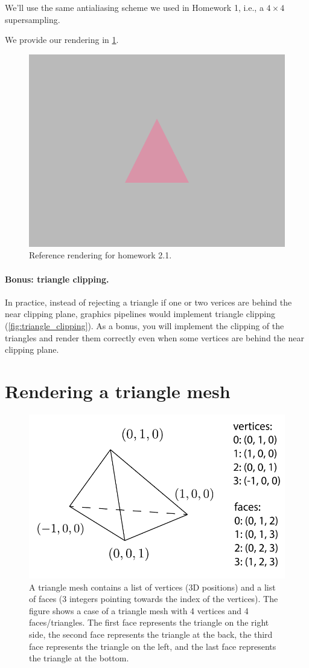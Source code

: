 We'll use the same antialiasing scheme we used in Homework 1, i.e., a $4\times4$ supersampling.

We provide our rendering in \cref{fig:hw2_1}.
\begin{figure}[h]
    \centering
    \includegraphics[width=0.7\linewidth]{imgs/hw_2_1.png}
    \caption{Reference rendering for homework 2.1.}
    \label{fig:hw2_1}
\end{figure}

\paragraph{Bonus: triangle clipping.} In practice, instead of rejecting a triangle if one or two verices are behind the near clipping plane, graphics pipelines would implement triangle clipping (\cref{fig:triangle_clipping}). As a bonus, you will implement the clipping of the triangles and render them correctly even when some vertices are behind the near clipping plane.

\section{Rendering a triangle mesh}

\begin{figure}[h]
    \centering
    \includegraphics[width=0.7\linewidth]{imgs/triangle_mesh.pdf}
    \caption{A triangle mesh contains a list of vertices (3D positions) and a list of faces (3 integers pointing towards the index of the vertices). The figure shows a case of a triangle mesh with 4 vertices and 4 faces/triangles. The first face represents the triangle on the right side, the second face represents the triangle at the back, the third face represents the triangle on the left, and the last face represents the triangle at the bottom.}
    \label{fig:triangle_mesh}
\end{figure}

